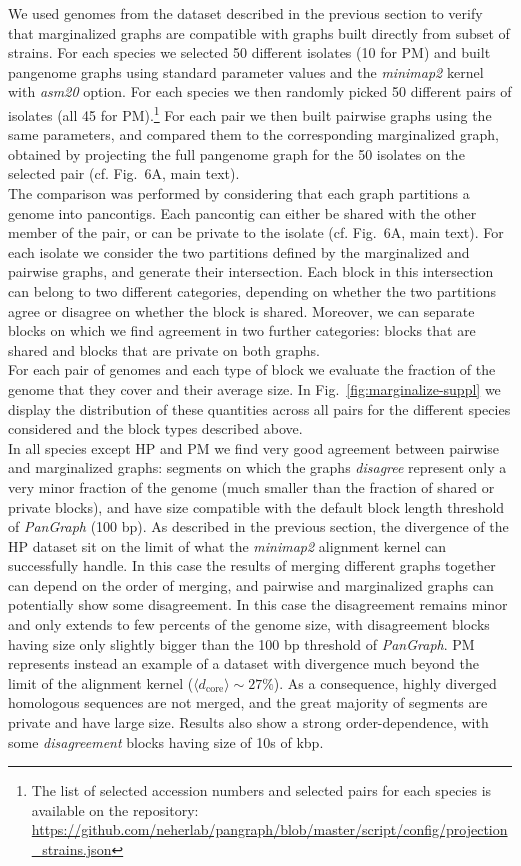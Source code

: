 \documentclass[aps,rmp,reprint,superscriptaddress,notitlepage,10pt,onecolumn]{revtex4-1}
\newcommand{\dcore}{\langle d_\text{core} \rangle}
\begin{document}
We used genomes from the dataset described in the previous section to verify that marginalized graphs are compatible with graphs built directly from subset of strains. For each species we selected 50 different isolates (10 for PM) and built pangenome graphs using standard parameter values and the \textit{minimap2} kernel with \textit{asm20} option. For each species we then randomly picked 50 different pairs of isolates (all 45 for PM).\footnote{The list of selected accession numbers and selected pairs for each species is available on the repository: \url{https://github.com/neherlab/pangraph/blob/master/script/config/projection_strains.json}} For each pair we then built pairwise graphs using the same parameters, and compared them to the corresponding marginalized graph, obtained by projecting the full pangenome graph for the 50 isolates on the selected pair (cf. Fig.~6A, main text).\\
The comparison was performed by considering that each graph partitions a genome into pancontigs. Each pancontig can either be shared with the other member of the pair, or can be private to the isolate (cf. Fig.~6A, main text). For each isolate we consider the two partitions defined by the marginalized and pairwise graphs, and generate their intersection. Each block in this intersection can belong to two different categories, depending on whether the two partitions agree or disagree on whether the block is shared. Moreover, we can separate blocks on which we find agreement in two further categories: blocks that are shared and blocks that are private on both graphs.\\
For each pair of genomes and each type of block we evaluate the fraction of the genome that they cover and their average size. In Fig.~\ref{fig:marginalize-suppl} we display the distribution of these quantities across all pairs for the different species considered and the block types described above.\\
In all species except HP and PM we find very good agreement between pairwise and marginalized graphs: segments on which the graphs \textit{disagree} represent only a very minor fraction of the genome (much smaller than the fraction of shared or private blocks), and have size compatible with the default block length threshold of \textit{PanGraph} (100 bp).
As described in the previous section, the divergence of the HP dataset sit on the limit of what the \textit{minimap2} alignment kernel can successfully handle. In this case the results of merging different graphs together can depend on the order of merging, and pairwise and marginalized graphs can potentially show some disagreement. In this case the disagreement remains minor and only extends to few percents of the genome size, with disagreement blocks having size only slightly bigger than the 100 bp threshold of \textit{PanGraph}.
PM represents instead an example of a dataset with divergence much beyond the limit of the alignment kernel ($\dcore \sim 27 \%$). As a consequence, highly diverged homologous sequences are not merged, and the great majority of segments are private and have large size. Results also show a strong order-dependence, with some \textit{disagreement} blocks having size of 10s of kbp.
\end{document}
